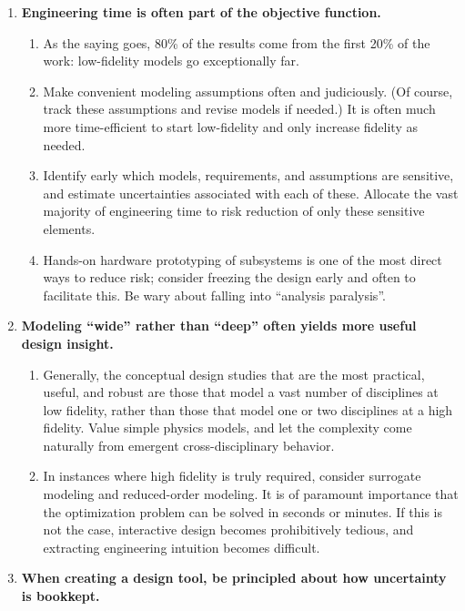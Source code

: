 \begin{enumerate}
    \item \textbf{Engineering time is often part of the objective function.}
    \begin{enumerate}
        \item As the saying goes, 80\% of the results come from the first 20\% of the work: low-fidelity models go exceptionally far.
        \item Make convenient modeling assumptions often and judiciously. (Of course, track these assumptions and revise models if needed.) It is often much more time-efficient to start low-fidelity and only increase fidelity as needed.
        \item Identify early which models, requirements, and assumptions are sensitive, and estimate uncertainties associated with each of these. Allocate the vast majority of engineering time to risk reduction of only these sensitive elements.
        \item Hands-on hardware prototyping of subsystems is one of the most direct ways to reduce risk; consider freezing the design early and often to facilitate this. Be wary about falling into ``analysis paralysis''.
    \end{enumerate}
    \item \textbf{Modeling ``wide'' rather than ``deep'' often yields more useful design insight.}
    \begin{enumerate}
        \item Generally, the conceptual design studies that are the most practical, useful, and robust are those that model a vast number of disciplines at low fidelity, rather than those that model one or two disciplines at a high fidelity. Value simple physics models, and let the complexity come naturally from emergent cross-disciplinary behavior.
        \item In instances where high fidelity is truly required, consider surrogate modeling and reduced-order modeling. It is of paramount importance that the optimization problem can be solved in seconds or minutes. If this is not the case, interactive design becomes prohibitively tedious, and extracting engineering intuition becomes difficult.
    \end{enumerate}
    \item \textbf{When creating a design tool, be principled about how uncertainty is bookkept.}
    \begin{enumerate}

\end{enumerate}
\end{enumerate}
